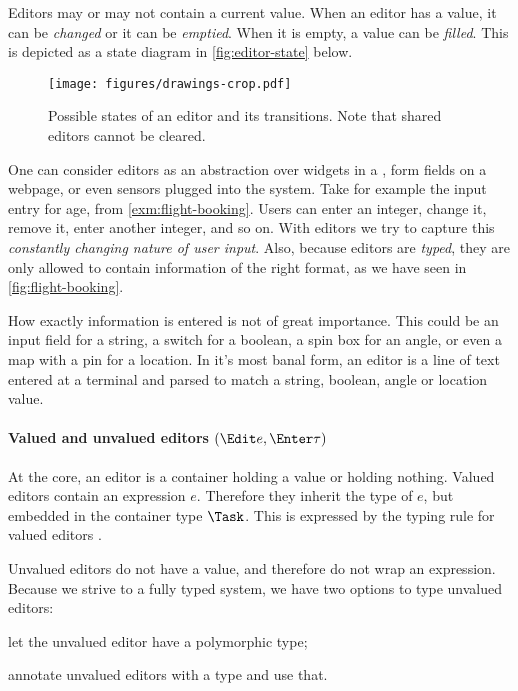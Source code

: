 Editors may or may not contain a current value.
When an editor has a value, it can be \emph{changed} or it can be \emph{emptied}.
When it is empty, a value can be \emph{filled}.
This is depicted as a state diagram in \autoref{fig:editor-state} below.

\begin{figure}[h]
  \centering
  \texttt{[image: figures/drawings-crop.pdf]}
  \caption{
    Possible states of an editor and its transitions.
    Note that shared editors cannot be cleared.
  }
  \label{fig:editor-state}
\end{figure}

One can consider editors as an abstraction over widgets in a \GUI,
form fields on a webpage,
or even sensors plugged into the system.
Take for example the input entry for age,
from \autoref{exm:flight-booking}.
Users can enter an integer, change it, remove it, enter another integer, and so on.
With editors we try to capture this \emph{constantly changing nature of user input}.
Also, because editors are \emph{typed},
they are only allowed to contain information of the right format,
as we have seen in \autoref{fig:flight-booking}.

How exactly information is entered is not of great importance.
This could be an input field for a string,
a switch for a boolean,
a spin box for an angle,
or even a map with a pin for a location.
In it's most banal form,
an editor is a line of text entered at a terminal and parsed to match
a string, boolean, angle or location value.



\paragraph{Valued and unvalued editors $(\Edit e, \Enter \tau)$}

At the core,
an editor is a container holding a value
or holding nothing.
Valued editors contain an expression $e$.
Therefore they inherit the type of $e$,
but embedded in the container type $\Task$.
This is expressed by the typing rule for valued editors .

Unvalued editors do not have a value,
and therefore do not wrap an expression.
Because we strive to a fully typed system,
we have two options to type unvalued editors:
\begin{enumerate*}
  \item let the unvalued editor have a polymorphic type;
  \item annotate unvalued editors with a type and use that. \label{itm:annotate}
\end{enumerate*}

